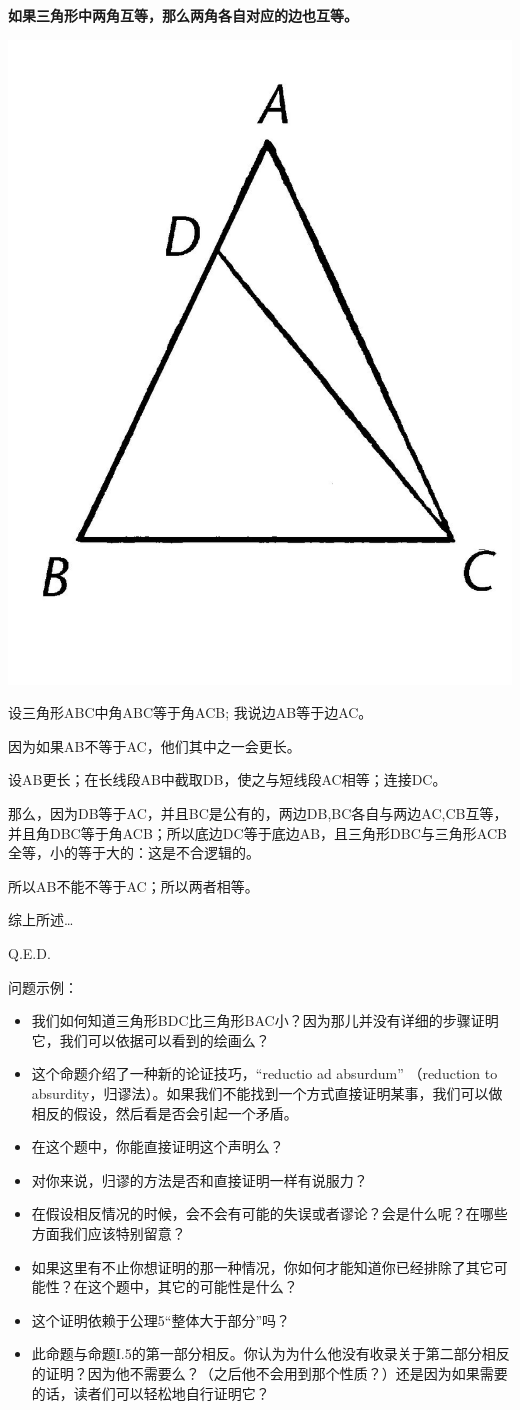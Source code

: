 \documentclass[
]{book}
\providecommand{\tightlist}{%
  \setlength{\itemsep}{0pt}\setlength{\parskip}{0pt}}
\begin{document}
\textbf{如果三角形中两角互等，那么两角各自对应的边也互等。}

\includegraphics[width=0.25\linewidth]{./image/img458}

设三角形ABC中角ABC等于角ACB; 我说边AB等于边AC。

因为如果AB不等于AC，他们其中之一会更长。

设AB更长；在长线段AB中截取DB，使之与短线段AC相等；连接DC。

那么，因为DB等于AC，并且BC是公有的，两边DB,BC各自与两边AC,CB互等，并且角DBC等于角ACB；所以底边DC等于底边AB，且三角形DBC与三角形ACB全等，小的等于大的：这是不合逻辑的。

所以AB不能不等于AC；所以两者相等。

综上所述\ldots{}

Q.E.D.

问题示例：

\begin{itemize}
\tightlist
\item
  我们如何知道三角形BDC比三角形BAC小？因为那儿并没有详细的步骤证明它，我们可以依据可以看到的绘画么？
\item
  这个命题介绍了一种新的论证技巧，``reductio ad absurdum'' （reduction to absurdity，归谬法）。如果我们不能找到一个方式直接证明某事，我们可以做相反的假设，然后看是否会引起一个矛盾。
\item
  在这个题中，你能直接证明这个声明么？
\item
  对你来说，归谬的方法是否和直接证明一样有说服力？
\item
  在假设相反情况的时候，会不会有可能的失误或者谬论？会是什么呢？在哪些方面我们应该特别留意？
\item
  如果这里有不止你想证明的那一种情况，你如何才能知道你已经排除了其它可能性？在这个题中，其它的可能性是什么？
\item
  这个证明依赖于公理5``整体大于部分''吗？
\item
  此命题与命题I.5的第一部分相反。你认为为什么他没有收录关于第二部分相反的证明？因为他不需要么？（之后他不会用到那个性质？）还是因为如果需要的话，读者们可以轻松地自行证明它？
\end{itemize}
\end{document}
